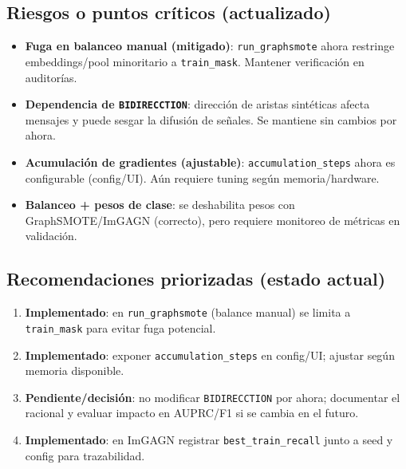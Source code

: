 \subsection{Riesgos o puntos cr\'iticos (actualizado)}
\begin{itemize}[leftmargin=*]
  \item \textbf{Fuga en balanceo manual (mitigado)}: \texttt{run\_graphsmote} ahora restringe embeddings/pool minoritario a \texttt{train\_mask}. Mantener verificaci\'on en auditor\'ias.
  \item \textbf{Dependencia de \texttt{BIDIRECCTION}}: direcci\'on de aristas sint\'eticas afecta mensajes y puede sesgar la difusi\'on de se\~nales. Se mantiene sin cambios por ahora.
  \item \textbf{Acumulaci\'on de gradientes (ajustable)}: \texttt{accumulation\_steps} ahora es configurable (config/UI). A\'un requiere tuning seg\'un memoria/hardware.
  \item \textbf{Balanceo + pesos de clase}: se deshabilita pesos con GraphSMOTE/ImGAGN (correcto), pero requiere monitoreo de m\'etricas en validaci\'on.
\end{itemize}

\subsection{Recomendaciones priorizadas (estado actual)}
\begin{enumerate}[leftmargin=*]
  \item \textbf{Implementado}: en \texttt{run\_graphsmote} (balance manual) se limita a \texttt{train\_mask} para evitar fuga potencial.
  \item \textbf{Implementado}: exponer \texttt{accumulation\_steps} en config/UI; ajustar seg\'un memoria disponible.
  \item \textbf{Pendiente/decisi\'on}: no modificar \texttt{BIDIRECCTION} por ahora; documentar el racional y evaluar impacto en AUPRC/F1 si se cambia en el futuro.
  \item \textbf{Implementado}: en ImGAGN registrar \texttt{best\_train\_recall} junto a seed y config para trazabilidad.
\end{enumerate}

